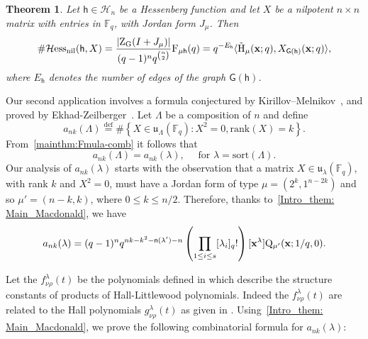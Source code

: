 \documentclass[12pt,a4paper,reqno]{amsart}
\theoremstyle{plain}
\newtheorem{theorem}{Theorem}[section]
\theoremstyle{definition}
\newcommand{\defin}{\overset{\mathrm{def}}{=}}
\newcommand{\FF}{{\mathbb{F}}}
\newcommand{\1}{\mathds{1}}
\newcommand{\G}{{\mathrm{G}}}
\newcommand{\F}{\mathrm{F}}
\newcommand{\HH}{\mathrm{H}}
\newcommand{\K}{{\mathrm{K}}}
\newcommand{\Q}{\mathrm{Q}}
\newcommand{\Z}{\mathrm{Z}}
\renewcommand{\u}{\mathfrak{u}}
\newcommand{\x}{{\bf x}}
\newcommand{\fn}{\mathsf{n}}
\newcommand{\hes}{\mathsf{h}}
\newcommand{\graph}{\mathsf{G}}
\begin{document}
\begin{theorem}
\label{thm:nilphess}
 Let $\hes\in\mathcal{H}_n$ be a Hessenberg function and let $X$ be a nilpotent $n\times n$ matrix with entries in $\FF_q$, with Jordan form $J_\mu$. Then 
$$
\#\mathrm{\mathcal{H}ess_{nil}}(\hes,X)=\frac{|\Z_\G(I+J_\mu)|}{(q-1)^nq^{\binom{n}{2}}}\F_{\mu\hes}(q)=q^{-E_\hes}\langle \tilde{\HH}_\mu(\x;q),X_{\graph(\hes)}(\x;q)\rangle,%
$$
where $E_\hes$ denotes the number of edges of the graph $\graph(\hes)$.
\end{theorem}









Our second application involves a formula conjectured by Kirillov–Melnikov~\cite{KirillovMelnikov}, and  proved by Ekhad-Zeilberger~\cite{Ekhad}.
Let $\Lambda$ be a composition of $n$ and define
\begin{equation}
\label{eq:ankaka}
a_{nk}(\Lambda)\defin \# \left\{X\in \u_{\Lambda}(\FF_q): X^2=0, \mathrm{rank}(X)=k\right\}.
\end{equation}
From~\cref{mainthm:Fmula-comb} it follows that \[
a_{nk}(\Lambda)=a_{nk}(\lambda),
\quad\text{ for }\lambda=\mathrm{sort}(\Lambda). 
\]
Our analysis of $a_{nk}(\lambda)$ starts with the observation that a matrix $X \in \mathfrak{u}_\lambda(\mathbb{F}_q)$, with rank $k$ and $X^2 = 0$, must have a Jordan form of type $\mu = (2^k, 1^{n-2k})$ and so $\mu' = (n-k, k)$, where $0 \leq k \leq n/2$.
Therefore, thanks to~\cref{Intro_them: Main_Macdonald}, we have
\begin{equation}\label{Into:ankQ_formula}
a_{nk}(\lambda)=(q-1)^n q^{nk-k^2- \fn(\lambda') - n} \left( \prod_{1\leq i\leq s} [\lambda_i]_q! \right) [\x^\lambda] \Q_{\mu'}(\x; 1/q, 0).
\end{equation}


  
Let the $f_{\nu\rho}^\lambda(t)$ be the polynomials defined in \cite[Sec. III.3, p. 215]{Macdonald} which describe the structure constants of products of Hall-Littlewood polynomials. Indeed the $f_{\nu\rho}^\lambda(t)$ are related to the Hall polynomials $g_{\nu\rho}^\lambda(t)$ as given in  \cite[Eq. (3.6), p. 217]{Macdonald}.
Using~\cref{Intro_them: Main_Macdonald}, we prove the following combinatorial formula for $a_{nk}(\lambda)$: 
\end{document}
